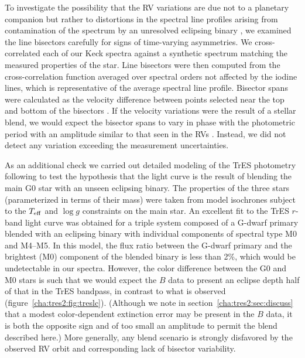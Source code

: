To investigate the possibility that the RV variations are due not to a
planetary companion but rather to distortions in the spectral line
profiles arising from contamination of the spectrum by an unresolved
eclipsing binary \citep[][]{Santos_Mayor_Naef:aa:2002a,
  Torres_Konacki_Sasselov:apj:2005a}, we examined the line bisectors
carefully for signs of time-varying asymmetries. We cross-correlated
each of our Keck spectra against a synthetic spectrum matching the
measured properties of the star. Line bisectors were then computed
from the cross-correlation function averaged over spectral orders not
affected by the iodine lines, which is representative of the average
spectral line profile.  Bisector spans were calculated as the velocity
difference between points selected near the top and bottom of the
bisectors \citet{Torres_Konacki_Sasselov:apj:2005a}. If the
velocity variations were the result of a stellar blend, we would
expect the bisector spans to vary in phase with the photometric period
with an amplitude similar to that seen in the RVs
\citep{Queloz_Henry_Sivan:aa:2001a, Mandushev_Torres_Latham:apj:2005a}.
 Instead, we did not detect any variation exceeding the measurement uncertainties.

As an additional check we carried out detailed modeling of the TrES
photometry following \citet{Torres_Konacki_Sasselov:apj:2004b} to test
the hypothesis that the light curve is the result of blending the
main G0 star with an unseen eclipsing binary. The properties of the
three stars (parameterized in terms of their mass) were taken from
model isochrones subject to the $T_{\rm eff}$ and $\log{g}$
constraints on the main star. An
excellent fit to the TrES $r$-band light curve was obtained for a
triple system composed of a G-dwarf primary blended with an
eclipsing binary with individual components of spectral type M0 and
M4--M5.  In this model, the flux ratio between the G-dwarf primary
and the brightest (M0) component of the blended binary is less than
2\%, which would be undetectable in our spectra.
However, the color difference between the G0 and M0 stars is
such that we would expect the $B$ data to present an eclipse depth
half of that in the TrES bandpass, in contrast to what is observed
(figure~\ref{cha:tres2:fig:treslc}). (Although we note in section~\ref{cha:tres2:sec:discuss}
that a modest color-dependent extinction error may be present in the $B$ data,
it is both the opposite sign and of too small an amplitude to permit the
blend described here.)  More generally, any blend scenario is strongly
disfavored by the observed RV orbit and corresponding lack of bisector
variability.

